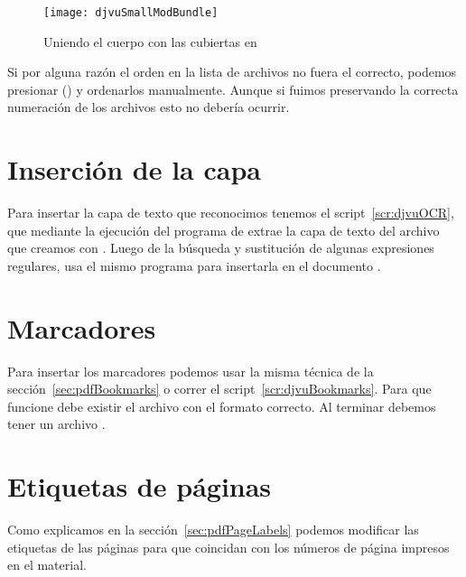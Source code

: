 \documentclass[%
	a5paper,
	10pt,
	twoside,
	openright,
	final,
]{memoir}
\begin{document}
{	\begin{figure}
		\texttt{[image: djvuSmallModBundle]}
		\caption{Uniendo el cuerpo con las cubiertas en \djvusmallmod\label{fig:djvuSmallModBundle}}
	\end{figure}

	Si por alguna razón el orden en la lista de archivos no fuera el correcto, podemos presionar  () y ordenarlos manualmente. Aunque si fuimos preservando la correcta numeración de los archivos esto no debería ocurrir.

	\section{Inserción de la capa \texorpdfstring{\ocr}{OCR}\label{sec:djvuOCR}} Para insertar la capa de texto que reconocimos tenemos el script~\ref{scr:djvuOCR}, que mediante la ejecución del programa  de \djvulibre extrae la capa de texto del archivo  que creamos con \abbyy. Luego de la búsqueda y sustitución de algunas expresiones regulares, usa el mismo programa para insertarla en el documento .


	\section{Marcadores\label{sec:djvuBookmarks}} Para insertar los marcadores podemos usar la misma técnica de la sección~\ref{sec:pdfBookmarks} o correr el script~\ref{scr:djvuBookmarks}. Para que funcione debe existir el archivo  con el formato correcto. Al terminar debemos tener un archivo .


	\section{Etiquetas de páginas\label{sec:djvuPageLabels}} Como explicamos en la sección~\ref{sec:pdfPageLabels} podemos modificar las etiquetas de las páginas para que coincidan con los números de página impresos en el material.

}
\end{document}

